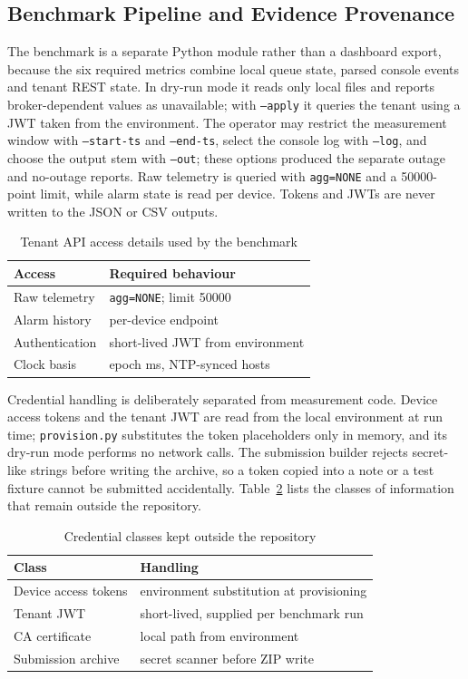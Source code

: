 \documentclass[conference]{IEEEtran}
\begin{document}
\subsection{Benchmark Pipeline and Evidence Provenance}
\label{sec:benchmark-pipeline}

The benchmark is a separate Python module rather than a dashboard export, because
the six required metrics combine local queue state, parsed console events and
tenant REST state. In dry-run mode it reads only local files and reports
broker-dependent values as unavailable; with \texttt{--apply} it queries the
tenant using a JWT taken from the environment. The operator may restrict the
measurement window with \texttt{--start-ts} and \texttt{--end-ts}, select the
console log with \texttt{--log}, and choose the output stem with \texttt{--out};
these options produced the separate outage and no-outage reports. Raw telemetry
is queried with \texttt{agg=NONE} and a 50000-point limit, while alarm state is
read per device. Tokens and JWTs are never written to the JSON or CSV outputs.

\begin{table}[t]
\caption{Tenant API access details used by the benchmark}
\label{tab:endpoints}
\centering
\scriptsize
\begin{tabular}{@{}ll@{}}
\toprule
Access & Required behaviour \\
\midrule
Raw telemetry & \texttt{agg=NONE}; limit 50000 \\
Alarm history & per-device endpoint \\
Authentication & short-lived JWT from environment \\
Clock basis & epoch ms, NTP-synced hosts \\
\bottomrule
\end{tabular}
\end{table}

Credential handling is deliberately separated from measurement code. Device
access tokens and the tenant JWT are read from the local environment at run
time; \texttt{provision.py} substitutes the token placeholders only in memory,
and its dry-run mode performs no network calls. The submission builder rejects
secret-like strings before writing the archive, so a token copied into a note or
a test fixture cannot be submitted accidentally. Table~\ref{tab:secrets} lists
the classes of information that remain outside the repository.

\begin{table}[t]
\caption{Credential classes kept outside the repository}
\label{tab:secrets}
\centering
\scriptsize
\begin{tabular}{@{}ll@{}}
\toprule
Class & Handling \\
\midrule
Device access tokens & environment substitution at provisioning \\
Tenant JWT & short-lived, supplied per benchmark run \\
CA certificate & local path from environment \\
Submission archive & secret scanner before ZIP write \\
\bottomrule
\end{tabular}
\end{table}
\end{document}
